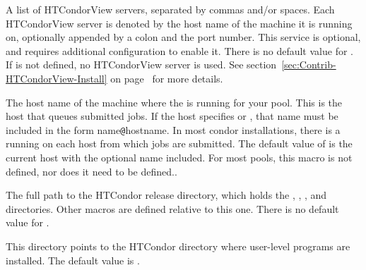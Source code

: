 \begin{description}

\label{param:CondorViewHost}
\item[\Macro{CONDOR\_VIEW\_HOST}]
  A list of HTCondorView servers, separated by commas and/or spaces.
  Each HTCondorView server is denoted by the host name of the machine
  it is running on, optionally appended by a colon and the port number.
  This service is optional, and requires additional configuration 
  to enable it.  There is no default value for
  .  If  is not
  defined, no HTCondorView server is used.
  See section~\ref{sec:Contrib-HTCondorView-Install} on
  page~\pageref{sec:Contrib-HTCondorView-Install} for more details.

\label{param:ScheddHost}
\item[\Macro{SCHEDD\_HOST}]
  The host name of the machine where the  is running for
  your pool.  This is the host that queues submitted jobs.
  If the host specifies  or , that
  name must be included in the form name\verb$@$hostname.
  In most condor installations, there is a  running on
  each host from which jobs are submitted.  The default value of
   is the current host with the optional name included.  For most pools, this
  macro is not defined, nor does it need to be defined..

\label{param:ReleaseDir}
\item[\Macro{RELEASE\_DIR}]
  The full path to
  the HTCondor release directory, which holds the ,
  , , and  directories.  Other macros
  are defined relative to this one.  There is no default value for
  .

\label{param:Bin}
\item[\Macro{BIN}]
  This directory points to the
  HTCondor directory where user-level programs are installed.
  The default value is .
  

\end{description}
